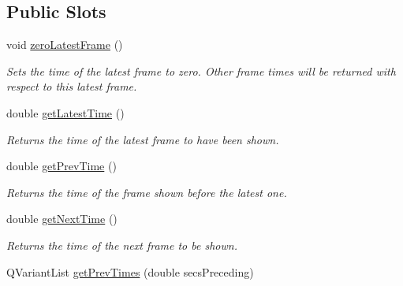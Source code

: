 \subsection*{Public Slots}
\begin{DoxyCompactItemize}
\item 
\hypertarget{class_picto_1_1_analysis_frame_data_ad970956f71ca065902ef89dbe4b96880}{void \hyperlink{class_picto_1_1_analysis_frame_data_ad970956f71ca065902ef89dbe4b96880}{zero\-Latest\-Frame} ()}\label{class_picto_1_1_analysis_frame_data_ad970956f71ca065902ef89dbe4b96880}

\begin{DoxyCompactList}\small\item\em Sets the time of the latest frame to zero. Other frame times will be returned with respect to this latest frame. \end{DoxyCompactList}\item 
\hypertarget{class_picto_1_1_analysis_frame_data_a90fefc1694d36791c73c24fdc6e832c6}{double \hyperlink{class_picto_1_1_analysis_frame_data_a90fefc1694d36791c73c24fdc6e832c6}{get\-Latest\-Time} ()}\label{class_picto_1_1_analysis_frame_data_a90fefc1694d36791c73c24fdc6e832c6}

\begin{DoxyCompactList}\small\item\em Returns the time of the latest frame to have been shown. \end{DoxyCompactList}\item 
\hypertarget{class_picto_1_1_analysis_frame_data_aabe29469b75d8483cf53ea65c9ad9e29}{double \hyperlink{class_picto_1_1_analysis_frame_data_aabe29469b75d8483cf53ea65c9ad9e29}{get\-Prev\-Time} ()}\label{class_picto_1_1_analysis_frame_data_aabe29469b75d8483cf53ea65c9ad9e29}

\begin{DoxyCompactList}\small\item\em Returns the time of the frame shown before the latest one. \end{DoxyCompactList}\item 
\hypertarget{class_picto_1_1_analysis_frame_data_a5f1db7c4a09f0a0c97c81e8367df13e8}{double \hyperlink{class_picto_1_1_analysis_frame_data_a5f1db7c4a09f0a0c97c81e8367df13e8}{get\-Next\-Time} ()}\label{class_picto_1_1_analysis_frame_data_a5f1db7c4a09f0a0c97c81e8367df13e8}

\begin{DoxyCompactList}\small\item\em Returns the time of the next frame to be shown. \end{DoxyCompactList}\item 
\hypertarget{class_picto_1_1_analysis_frame_data_abedce898d1738ee1ac6d7e1cff97392f}{Q\-Variant\-List \hyperlink{class_picto_1_1_analysis_frame_data_abedce898d1738ee1ac6d7e1cff97392f}{get\-Prev\-Times} (double secs\-Preceding)}\label{class_picto_1_1_analysis_frame_data_abedce898d1738ee1ac6d7e1cff97392f}


\end{DoxyCompactItemize}
